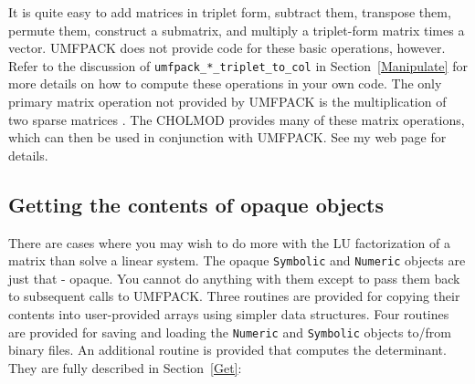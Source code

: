 \documentclass[11pt]{article}
\begin{document}
It is quite easy to add matrices in triplet form, subtract them, transpose
them, permute them, construct a submatrix, and multiply a triplet-form matrix
times a vector.  UMFPACK does not provide code for these basic operations,
however.  Refer to the discussion of
{\tt umfpack\_*\_triplet\_to\_col} in Section~\ref{Manipulate} for more details
on how to compute these operations in your own code.
The only primary matrix operation not provided by UMFPACK is the
multiplication of two sparse matrices \cite{Gustavson78}.
The CHOLMOD provides many of these matrix operations, which
can then be used in conjunction with UMFPACK.
See my web page for details.

\subsection{Getting the contents of opaque objects}

There are cases where you may wish to do more with the LU factorization
of a matrix than solve a linear system.  The opaque {\tt Symbolic} and
{\tt Numeric} objects are just that - opaque.  You cannot do anything with them
except to pass them back to subsequent calls to UMFPACK.  Three routines
are provided for copying their contents into user-provided arrays using simpler
data structures.  Four routines are provided for saving and loading the
{\tt Numeric} and {\tt Symbolic} objects to/from binary files.
An additional routine is provided that computes the determinant.
They are fully described in Section~\ref{Get}:
\end{document}
